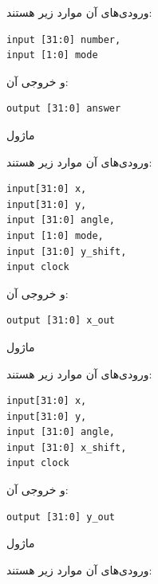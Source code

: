 \documentclass[12pt,titlepage,a4page , tikz , multi,table , svgnames,xcdraw]{article}
\begin{document}
 ورودی‌های آن موارد زیر هستند:

\begin{latin}
\begin{verbatim}
input [31:0] number,
input [1:0] mode
\end{verbatim}
\end{latin}

و خروجی آن:

\begin{latin}
\begin{verbatim}
output [31:0] answer
\end{verbatim}
\end{latin}

\hrulefill


ماژول  

 
 ورودی‌های آن موارد زیر هستند:

\begin{latin}
\begin{verbatim}
input[31:0] x,
input[31:0] y,
input [31:0] angle,
input [1:0] mode,
input [31:0] y_shift,
input clock
\end{verbatim}
\end{latin}

و خروجی آن:

\begin{latin}
\begin{verbatim}
output [31:0] x_out
\end{verbatim}
\end{latin}


\hrulefill
 

ماژول  
 
 ورودی‌های آن موارد زیر هستند:

\begin{latin}
\begin{verbatim}
input[31:0] x,
input[31:0] y,
input [31:0] angle,
input [31:0] x_shift,
input clock
\end{verbatim}
\end{latin}

و خروجی آن:

\begin{latin}
\begin{verbatim}
output [31:0] y_out
\end{verbatim}
\end{latin}


\hrulefill


ماژول 

 
 ورودی‌های آن موارد زیر هستند:
\end{document}
